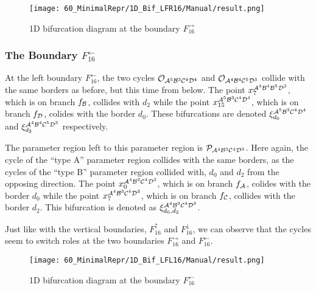 \begin{figure}
	\centering
	\texttt{[image: 60\_MinimalRepr/1D\_Bif\_LFR16/Manual/result.png]}
	\label{fig:final.bifurcation.F.right}
	\caption{1D bifurcation diagram at the boundary $F_{16}^\rightarrow$}
\end{figure}

\subsubsection{The Boundary $F_{16}^\leftarrow$}
\label{sec:minrep.bif.L}

At the left boundary $F_{16}^\leftarrow$, the two cycles $\mathcal{O}_{\mathcal{A}^5\mathcal{B}^3\mathcal{C}^4\mathcal{D}^4}$ and $\mathcal{O}_{\mathcal{A}^4\mathcal{B}^4\mathcal{C}^5\mathcal{D}^3}$ collide with the same borders as before, but this time from below.
The point $x_{7}^{\mathcal{A}^4\mathcal{B}^4\mathcal{B}^5\mathcal{D}^3}$, which is on branch $f_{\mathcal{B}}$, collides with $d_2$ while the point $x_{15}^{\mathcal{A}^5\mathcal{B}^3\mathcal{C}^4\mathcal{D}^4}$, which is on branch $f_{\mathcal{D}}$, colides with the border $d_0$.
These bifurcations are denoted $\xi_{d_0}^{\mathcal{A}^5\mathcal{B}^3\mathcal{C}^4\mathcal{D}^4}$ and $\xi_{d_2}^{\mathcal{A}^4\mathcal{B}^4\mathcal{C}^5\mathcal{D}^3}$ respectively.

The parameter region left to this parameter region is $\mathcal{P}_{\mathcal{A}^4\mathcal{B}^3\mathcal{C}^4\mathcal{D}^3}$.
Here again, the cycle of the ``type A'' parameter region collides with the same borders, as the cycles of the ``type B'' parameter region collided with, $d_0$ and $d_2$ from the opposing direction.
The point $x_{0}^{\mathcal{A}^4\mathcal{B}^3\mathcal{C}^4\mathcal{D}^3}$, which is on branch $f_{\mathcal{A}}$, colides with the border $d_0$ while the point $x_{7}^{\mathcal{A}^4\mathcal{B}^3\mathcal{C}^4\mathcal{D}^3}$, which is on branch $f_{\mathcal{C}}$, collides with the border $d_2$.
This bifurcation is denoted as $\xi_{d_0, d_2}^{\mathcal{A}^4\mathcal{B}^3\mathcal{C}^4\mathcal{D}^3}$.

Just like with the vertical boundaries, $F_{16}^\uparrow$ and $F_{16}^\downarrow$, we can observe that the cycles seem to switch roles at the two boundaries $F_{16}^\rightarrow$ and $F_{16}^\leftarrow$.

\begin{figure}
	\centering
	\texttt{[image: 60\_MinimalRepr/1D\_Bif\_LFL16/Manual/result.png]}
	\label{fig:final.bifurcation.F.left}
	\caption{1D bifurcation diagram at the boundary $F_{16}^\leftarrow$}
\end{figure}



